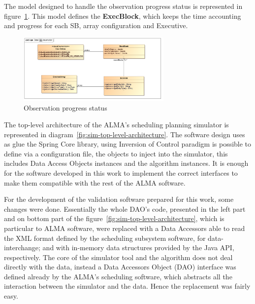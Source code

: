 The model designed to handle the observation progress status is represented in figure~\ref{fig:datamodel-observation}. This model defines the \textbf{ExecBlock}, which keeps the time accounting and progress for each SB, array configuration and Executive. 

\begin{figure}[htbp]	
\begin{center}
\includegraphics[width=0.67\textwidth]{images/Observation}
\end{center}
\caption{Observation progress status}
\label{fig:datamodel-observation}
\end{figure}

The top-level architecture of the ALMA's scheduling planning simulator is represented in diagram~\ref{fig:sim-top-level-architecture}. The software design uses as glue the Spring Core library, using Inversion of Control paradigm is possible to define via a configuration file, the objects to inject into the simulator, this includes Data Access Objects instances and the algorithm instances. It is enough for the software developed in this work to implement the correct interfaces to make them compatible with the rest of the ALMA software.

For the development of the validation software prepared for this work, some changes were done. Essentially the whole DAO's code, presented in the left part and on bottom part of the figure~\ref{fig:sim-top-level-architecture}, which is particular to ALMA software, were replaced with a Data Accessors able to read the XML format defined by the scheduling subsystem software, for data-interchange; and with in-memory data structures provided by the Java API, respectively. The core of the simulator tool and the algorithm does not deal directly with the data, instead a Data Accessors Object (DAO) interface was defined already by the ALMA's scheduling software, which abstracts all the interaction between the simulator and the data. Hence the replacement was fairly easy.

